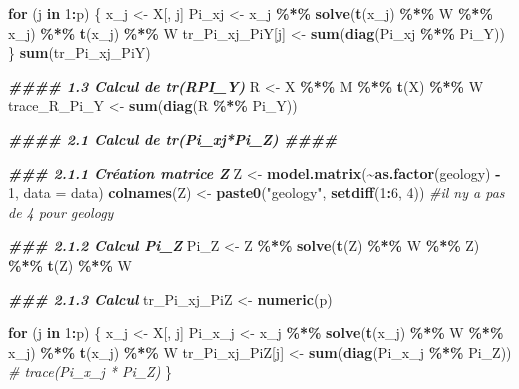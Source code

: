 \documentclass[
]{article}
\newenvironment{Shaded}{\begin{snugshade}}{\end{snugshade}}
\newcommand{\AttributeTok}[1]{\textcolor[rgb]{0.13,0.29,0.53}{#1}}
\newcommand{\CommentTok}[1]{\textcolor[rgb]{0.56,0.35,0.01}{\textit{#1}}}
\newcommand{\ControlFlowTok}[1]{\textcolor[rgb]{0.13,0.29,0.53}{\textbf{#1}}}
\newcommand{\DecValTok}[1]{\textcolor[rgb]{0.00,0.00,0.81}{#1}}
\newcommand{\DocumentationTok}[1]{\textcolor[rgb]{0.56,0.35,0.01}{\textbf{\textit{#1}}}}
\newcommand{\FunctionTok}[1]{\textcolor[rgb]{0.13,0.29,0.53}{\textbf{#1}}}
\newcommand{\NormalTok}[1]{#1}
\newcommand{\OtherTok}[1]{\textcolor[rgb]{0.56,0.35,0.01}{#1}}
\newcommand{\SpecialCharTok}[1]{\textcolor[rgb]{0.81,0.36,0.00}{\textbf{#1}}}
\newcommand{\StringTok}[1]{\textcolor[rgb]{0.31,0.60,0.02}{#1}}
\begin{document}
\begin{Shaded}
\begin{Highlighting}[]
\ControlFlowTok{for}\NormalTok{ (j }\ControlFlowTok{in} \DecValTok{1}\SpecialCharTok{:}\NormalTok{p) \{}
\NormalTok{    x\_j }\OtherTok{\textless{}{-}}\NormalTok{ X[, j]}
\NormalTok{    Pi\_xj }\OtherTok{\textless{}{-}}\NormalTok{ x\_j }\SpecialCharTok{\%*\%} \FunctionTok{solve}\NormalTok{(}\FunctionTok{t}\NormalTok{(x\_j) }\SpecialCharTok{\%*\%}\NormalTok{ W }\SpecialCharTok{\%*\%}\NormalTok{ x\_j) }\SpecialCharTok{\%*\%} \FunctionTok{t}\NormalTok{(x\_j) }\SpecialCharTok{\%*\%}\NormalTok{ W}
\NormalTok{    tr\_Pi\_xj\_PiY[j] }\OtherTok{\textless{}{-}} \FunctionTok{sum}\NormalTok{(}\FunctionTok{diag}\NormalTok{(Pi\_xj }\SpecialCharTok{\%*\%}\NormalTok{ Pi\_Y))}
\NormalTok{\}}
\FunctionTok{sum}\NormalTok{(tr\_Pi\_xj\_PiY)}

\DocumentationTok{\#\#\#\# 1.3 Calcul de tr(RPI\_Y)}
\NormalTok{R }\OtherTok{\textless{}{-}}\NormalTok{ X }\SpecialCharTok{\%*\%}\NormalTok{ M }\SpecialCharTok{\%*\%} \FunctionTok{t}\NormalTok{(X) }\SpecialCharTok{\%*\%}\NormalTok{ W}
\NormalTok{trace\_R\_Pi\_Y }\OtherTok{\textless{}{-}} \FunctionTok{sum}\NormalTok{(}\FunctionTok{diag}\NormalTok{(R }\SpecialCharTok{\%*\%}\NormalTok{ Pi\_Y))}

\DocumentationTok{\#\#\#\# 2.1 Calcul de tr(Pi\_xj*Pi\_Z) \#\#\#\#}

\DocumentationTok{\#\#\# 2.1.1 Création matrice Z}
\NormalTok{Z }\OtherTok{\textless{}{-}} \FunctionTok{model.matrix}\NormalTok{(}\SpecialCharTok{\textasciitilde{}}\FunctionTok{as.factor}\NormalTok{(geology) }\SpecialCharTok{{-}} \DecValTok{1}\NormalTok{, }\AttributeTok{data =}\NormalTok{ data)}
\FunctionTok{colnames}\NormalTok{(Z) }\OtherTok{\textless{}{-}} \FunctionTok{paste0}\NormalTok{(}\StringTok{"geology"}\NormalTok{, }\FunctionTok{setdiff}\NormalTok{(}\DecValTok{1}\SpecialCharTok{:}\DecValTok{6}\NormalTok{, }\DecValTok{4}\NormalTok{))  }\CommentTok{\#il n\textquotesingle{}y a pas de 4 pour geology }

\DocumentationTok{\#\#\# 2.1.2 Calcul Pi\_Z}
\NormalTok{Pi\_Z }\OtherTok{\textless{}{-}}\NormalTok{ Z }\SpecialCharTok{\%*\%} \FunctionTok{solve}\NormalTok{(}\FunctionTok{t}\NormalTok{(Z) }\SpecialCharTok{\%*\%}\NormalTok{ W }\SpecialCharTok{\%*\%}\NormalTok{ Z) }\SpecialCharTok{\%*\%} \FunctionTok{t}\NormalTok{(Z) }\SpecialCharTok{\%*\%}\NormalTok{ W}

\DocumentationTok{\#\#\# 2.1.3 Calcul}
\NormalTok{tr\_Pi\_xj\_PiZ }\OtherTok{\textless{}{-}} \FunctionTok{numeric}\NormalTok{(p)}

\ControlFlowTok{for}\NormalTok{ (j }\ControlFlowTok{in} \DecValTok{1}\SpecialCharTok{:}\NormalTok{p) \{}
\NormalTok{    x\_j }\OtherTok{\textless{}{-}}\NormalTok{ X[, j]}
\NormalTok{    Pi\_x\_j }\OtherTok{\textless{}{-}}\NormalTok{ x\_j }\SpecialCharTok{\%*\%} \FunctionTok{solve}\NormalTok{(}\FunctionTok{t}\NormalTok{(x\_j) }\SpecialCharTok{\%*\%}\NormalTok{ W }\SpecialCharTok{\%*\%}\NormalTok{ x\_j) }\SpecialCharTok{\%*\%} \FunctionTok{t}\NormalTok{(x\_j) }\SpecialCharTok{\%*\%}\NormalTok{ W}
\NormalTok{    tr\_Pi\_xj\_PiZ[j] }\OtherTok{\textless{}{-}} \FunctionTok{sum}\NormalTok{(}\FunctionTok{diag}\NormalTok{(Pi\_x\_j }\SpecialCharTok{\%*\%}\NormalTok{ Pi\_Z))  }\CommentTok{\# trace(Pi\_x\_j * Pi\_Z)}
\NormalTok{\}}


\end{Highlighting}
\end{Shaded}
\end{document}
